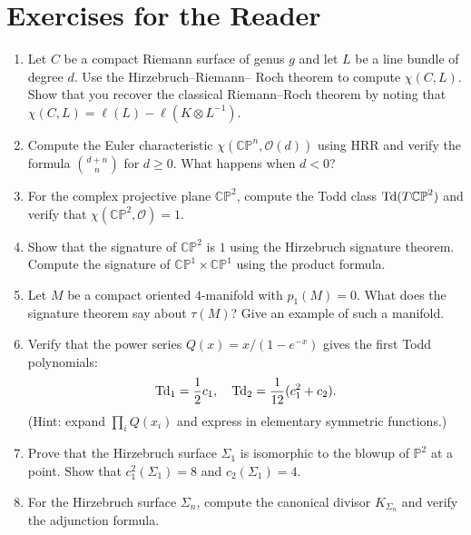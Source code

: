 \section*{Exercises for the Reader}

\begin{enumerate}
    \item [B] Let \(C\) be a compact Riemann surface of genus \(g\) and let
    \(L\) be a line bundle of degree \(d\). Use the Hirzebruch--Riemann--
    Roch theorem to compute \(\chi(C, L)\). Show that you recover the
    classical Riemann--Roch theorem by noting that
    \(\chi(C, L) = \ell(L) - \ell(K \otimes L^{-1})\).

    \item [B] Compute the Euler characteristic
    \(\chi(\mathbb{CP}^n, \mathcal{O}(d))\) using HRR and verify the
    formula \(\binom{d+n}{n}\) for \(d \ge 0\). What happens when
    \(d < 0\)?

    \item [B] For the complex projective plane \(\mathbb{CP}^2\), compute
    the Todd class \(\operatorname{Td}(T\mathbb{CP}^2)\) and verify that
    \(\chi(\mathbb{CP}^2, \mathcal{O}) = 1\).

    \item [B] Show that the signature of \(\mathbb{CP}^2\) is \(1\) using
    the Hirzebruch signature theorem. Compute the signature of
    \(\mathbb{CP}^1 \times \mathbb{CP}^1\) using the product formula.

    \item [I] Let \(M\) be a compact oriented \(4\)-manifold with
    \(p_1(M) = 0\). What does the signature theorem say about
    \(\tau(M)\)? Give an example of such a manifold.

    \item [I] Verify that the power series \(Q(x) = x/(1 - e^{-x})\) gives
    the first Todd polynomials:
    \[
    \operatorname{Td}_1 = \frac12 c_1,\quad
    \operatorname{Td}_2 = \frac1{12}(c_1^2 + c_2).
    \]
    (Hint: expand \(\prod_i Q(x_i)\) and express in elementary symmetric
    functions.)

    \item [I] Prove that the Hirzebruch surface \(\Sigma_1\) is isomorphic
    to the blowup of \(\mathbb{P}^2\) at a point. Show that
    \(c_1^2(\Sigma_1) = 8\) and \(c_2(\Sigma_1) = 4\).

    \item [I] For the Hirzebruch surface \(\Sigma_n\), compute the canonical
    divisor \(K_{\Sigma_n}\) and verify the adjunction formula.


\end{enumerate}
